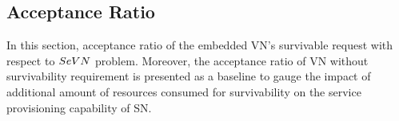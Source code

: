 



\subsection{Acceptance Ratio}
In this section, acceptance ratio of the embedded VN's survivable request with respect to $SeVN$ problem. Moreover, the acceptance ratio of VN without survivability requirement is presented as a baseline to gauge the impact of additional amount of resources consumed for survivability on the service provisioning capability of SN.

